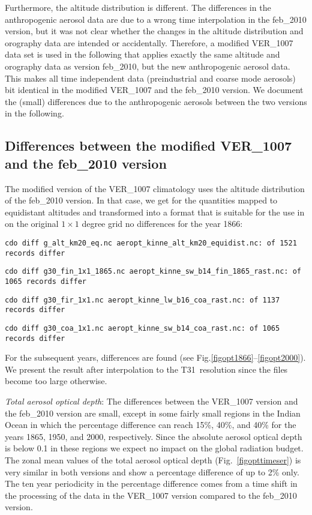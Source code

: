 \begin{appendix}
Furthermore, the altitude distribution is different. 
The differences in the anthropogenic aerosol data are due to a wrong
time interpolation in the feb\_2010 version, but 
it was not clear
whether the changes in the 
altitude distribution and orography data are intended or accidentally.
Therefore, a modified VER\_1007 data set is used in the following that
applies exactly the same altitude and orography data as version feb\_2010,
but the new anthropogenic aerosol data. This makes all time
independent data (preindustrial and coarse mode aerosols) bit
identical in the modified VER\_1007 and the feb\_2010 version.
We document the (small) differences due to the anthropogenic aerosols between
the two versions
in the following.

\subsection{Differences between the modified VER\_1007 
  and the feb\_2010 version}

The modified version of the VER\_1007 climatology uses the altitude
distribution of the feb\_2010 version. In that case, we get for the
quantities mapped to equidistant altitudes and transformed into a
format that is suitable for the use in \echam{} on the original
$1\times1$ degree grid no differences for the year 1866:

{\tt cdo diff g\_alt\_km20\_eq.nc
  aeropt\_kinne\_alt\_km20\_equidist.nc:  of 1521 records differ}

{\tt cdo diff g30\_fin\_1x1\_1865.nc
  aeropt\_kinne\_sw\_b14\_fin\_1865\_rast.nc:  of 1065 records differ}

{\tt cdo diff g30\_fir\_1x1.nc aeropt\_kinne\_lw\_b16\_coa\_rast.nc: of 1137 records differ}

{\tt cdo diff g30\_coa\_1x1.nc aeropt\_kinne\_sw\_b14\_coa\_rast.nc: of 1065 records differ}

For the subsequent years, differences are found (see
Fig.\ref{figopt1866}--\ref{figopt2000}). We present the result after
interpolation to the T31~resolution since the files become too large otherwise.

{\it Total aerosol optical depth}: The differences between the
VER\_1007 version and the feb\_2010 version are small, except in some
fairly small regions in the Indian Ocean in which the percentage
difference can reach 15\%, 40\%, and 40\% for the years 1865, 1950,
and 2000, respectively. Since the absolute aerosol optical depth is
below 0.1 in these regions we expect no impact on the global radiation
budget. The zonal mean values of the total aerosol optical depth
(Fig.~\ref{figopttimeser}) is very similar in both versions and show a
percentage difference of up to 2\% only. The ten year periodicity in the
percentage difference comes from a time shift in the processing of the data
in the VER\_1007 version compared to the feb\_2010 version. 


\end{appendix}
